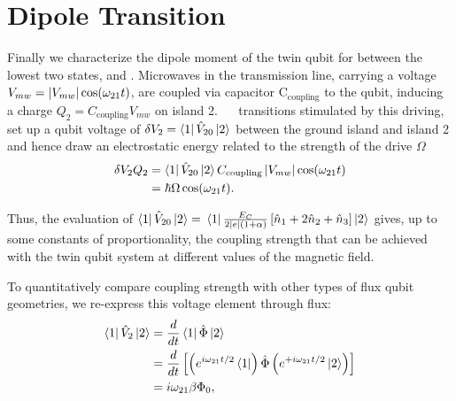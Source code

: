 \section{Dipole Transition}
\label{sec:dipole-transition}

\noindent Finally we characterize  the dipole moment of the twin qubit  for between the lowest
two states,   and .  Microwaves  in the transmission line,  carrying a voltage
$ V_{mw}=  \left|V_{mw}\right|\cos(\omega_{21 }t) $,  are coupled via capacitor  C$_{\text{coupling}}$ to
the   qubit,   inducing    a   charge   $   Q_{2}=C_{\text{coupling}}V_{mw}    $   on   island
2. ~\ilra~ transitions  stimulated by this driving, set up  a qubit voltage of
$ \delta V_2 = \Bra{1}\hat{V}_{20}\Ket{2} $ between the ground island and island 2 and hence draw
an electrostatic energy related to the strength of the drive $\Omega$
\begin{equation}
  \label{eq:dipoleEnergy}
  \begin{aligned}
    \delta V_{2}Q_{2} & = \Bra{1}\hat{V}_{20}\Ket{2} C_{\text{coupling}}\left|V_{mw}\right|\cos(\omega_{21}  t) \\
    & = \hbar\Omega\cos(\omega_{21}t).
  \end{aligned}
\end{equation}

\noindent    Thus,     the    evaluation    of    $     \Bra{1}\hat{V}_{20}\Ket{2}    =    $
$ \Bra{1}\frac{E_{C}}{2 \left|e\right|(1+\alpha)}\left[\hat{n}_1 + 2\hat{n}_2 +\hat{n}_3\right]\Ket{2}$
gives, up  to some constants  of proportionality, the coupling  strength that can  be achieved
with the twin qubit system at different values of the magnetic field.

To quantitatively  compare coupling  strength with  other types of  flux qubit  geometries, we
re-express this voltage element through flux:
\begin{equation}
  \label{eq:dipole_voltage_7}
  \begin{aligned}
    \Bra{1}\hat{V}_2 \Ket{2} & =  \frac{d}{dt}\Bra{1}\hat{\Phi}\Ket{2}\\
    & = \frac{d}{dt}\left[\left(e^{i\omega_{21}t/2}\Bra{1}\right) \hat{\Phi}\left(e^{+i\omega_{21}t/2}\Ket{2}\right)\right]\\
    & = {i\omega_{21}\beta\Phi_0},
  \end{aligned}
\end{equation}


